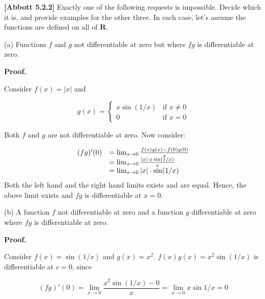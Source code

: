 \documentclass[10pt]{article}
\begin{document}
\textbf{[Abbott 5.2.2] }Exactly one of the following requests is impossible. Decide which it is, and provide examples for the other three. In each case, let's assume the functions are defined on all of $\displaystyle \mathbf{R}$.



(a) Functions $\displaystyle f$ and $\displaystyle g$ not differentiable at zero but where $\displaystyle fg$ is differentiable at zero. 



\textbf{Proof.}



Consider $\displaystyle f( x) =|x|$ and 


\begin{equation*}
g( x) =\begin{cases}
x\sin( 1/x) & \text{if } x\neq 0\\
0 & \text{if } x=0
\end{cases}
\end{equation*}


 Both $\displaystyle f$ and $\displaystyle g$ are not differentiable at zero. Now consider:


\begin{equation*}
\begin{array}{ l l }
( fg) '( 0) & =\lim _{x\rightarrow 0}\frac{f( x) g( x) -f( 0) g( 0)}{x}\\
 & =\lim _{x\rightarrow 0}\frac{|x|\cdot x\sin( 1/x)}{x}\\
 & =\lim _{x\rightarrow 0} |x|\cdot \sin( 1/x)
\end{array}
\end{equation*}
Both the left hand and the right hand limits exists and are equal. Hence, the above limit exists and $\displaystyle fg$ is differentiable at $\displaystyle x=0$.



(b) A function $\displaystyle f$ not differentiable at zero and a function $\displaystyle g$ differentiable at zero where $\displaystyle fg$ is differentiable at zero.



\textbf{Proof.}



Consider $\displaystyle f( x) =\sin( 1/x)$ and $\displaystyle g( x) =x^{2}$. $\displaystyle f( x) g( x) =x^{2}\sin( 1/x)$ is differentiable at $\displaystyle c=0$, since


\begin{equation*}
( fg) '( 0) =\lim _{x\rightarrow 0}\frac{x^{2}\sin( 1/x) -0}{x} =\lim _{x\rightarrow 0} x\sin 1/x=0
\end{equation*}
\end{document}

